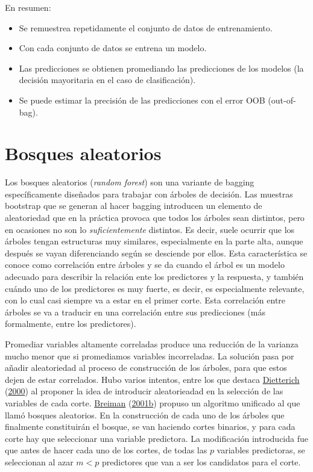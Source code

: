\documentclass[
  spanish,
]{book}
\theoremstyle{break}
\theoremstyle{definition}
\theoremstyle{definition}
\theoremstyle{definition}
\theoremstyle{definition}
\theoremstyle{remark}
\begin{document}
En resumen:

\begin{itemize}
\item
  Se remuestrea repetidamente el conjunto de datos de entrenamiento.
\item
  Con cada conjunto de datos se entrena un modelo.
\item
  Las predicciones se obtienen promediando las predicciones de los
  modelos (la decisión mayoritaria en el caso de clasificación).
\item
  Se puede estimar la precisión de las predicciones con el error OOB (out-of-bag).
\end{itemize}

\hypertarget{bosques-aleatorios}{%
\section{Bosques aleatorios}\label{bosques-aleatorios}}

Los bosques aleatorios (\emph{random forest}) son una variante de bagging específicamente diseñados para trabajar con árboles de decisión.
Las muestras bootstrap que se generan al hacer bagging introducen un elemento de aleatoriedad que en la práctica provoca que todos los árboles sean distintos, pero en ocasiones no son lo \emph{suficientemente} distintos.
Es decir, suele ocurrir que los árboles tengan estructuras muy similares, especialmente en la parte alta, aunque después se vayan diferenciando según se desciende por ellos.
Esta característica se conoce como correlación entre árboles y se da cuando el árbol es un modelo adecuado para describir la relación ente los predictores y la respuesta, y también cuándo uno de los predictores es muy fuerte, es decir, es especialmente relevante, con lo cual casi siempre va a estar en el primer corte.
Esta correlación entre árboles se va a traducir en una correlación entre sus predicciones (más formalmente, entre los predictores).

Promediar variables altamente correladas produce una reducción de la varianza mucho menor que si promediamos variables incorreladas.
La solución pasa por añadir aleatoriedad al proceso de construcción de los árboles, para que estos dejen de estar correlados.
Hubo varios intentos, entre los que destaca \protect\hyperlink{ref-dietterich2000experimental}{Dietterich} (\protect\hyperlink{ref-dietterich2000experimental}{2000}) al proponer la idea de introducir aleatorieadad en la selección de las variables de cada corte.
\protect\hyperlink{ref-breiman2001statistical}{Breiman} (\protect\hyperlink{ref-breiman2001statistical}{2001b}) propuso un algoritmo unificado al que llamó bosques aleatorios.
En la construcción de cada uno de los árboles que finalmente constituirán el bosque, se van haciendo cortes binarios, y para cada corte hay que seleccionar una variable predictora.
La modificación introducida fue que antes de hacer cada uno de los cortes, de todas las \(p\) variables predictoras, se seleccionan al azar \(m < p\) predictores que van a ser los candidatos para el corte.
\end{document}
